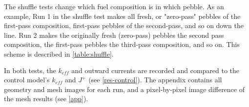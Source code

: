 


The shuffle tests change which fuel composition is in which pebble.  As an example, Run 1 in the shuffle test makes all fresh, or "zero-pass" pebbles of the first-pass composition, first-pass pebbles of the second-pass, and so on down the line.  Run 2 makes the originally fresh (zero-pass) pebbles the second pass composition, the first-pass pebbles the third-pass composition, and so on. This scheme is described in \ref{table:shuffle}.



In both tests, the $k_{eff}$ and outward currents are recorded and compared to the control model's $k_{eff}$ and $J^+$ (see \autoref{res-control}).  The appendix contains all geometry and mesh images for each run, and a pixel-by-pixel image difference of the mesh results (see \autoref{app}).